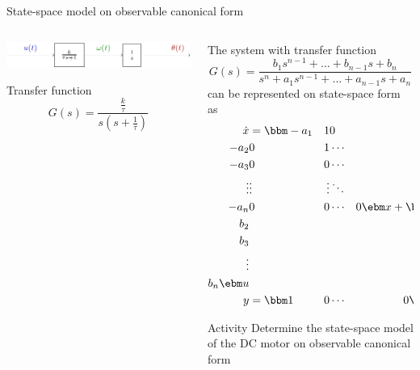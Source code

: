 \documentclass[presentation,aspectratio=169]{beamer}
\begin{document}
\begin{frame}[label={sec:org6bee89b}]{State-space model on observable canonical form}
\begin{columns}
\begin{column}{0.4\columnwidth}
\begin{center}
  \includegraphics[width=\linewidth]{../../figures/block-DC}
\end{center}

Transfer function
\[G(s) = \frac{ \frac{k}{\tau}} { s(s + \frac{1}{\tau})}\]
\end{column}
\begin{column}{0.6\columnwidth}
The system with transfer function
\begin{equation*}
G(s)=\frac{b_1s^{n-1}+\dots+b_{n-1}s+b_n}{s^n+a_1s^{n-1}+\dots
  +a_{n-1}s+a_n}
\end{equation*}
can be represented on state-space form as
\begin{align*}
\dot{x}&=\bbm -a_1& 1& 0 &\cdots &  0\\
-a_2 & 0& 1 &  \cdots& 0\\
-a_3 & 0 & 0& \cdots & 0\\
\vdots& \vdots& \vdots & \ddots& \vdots\\
-a_n& 0& 0 & \cdots& 0\ebm x+
\bbm b_1\\ b_2\\ b_3\\ \vdots\\ b_n\ebm u\\
y&=\bbm 1& 0& \cdots& 0 \ebm x
\end{align*}

\pause

\alert{Activity} Determine the state-space model of the DC motor on observable canonical form
\end{column}
\end{columns}
\end{frame}
\end{document}
